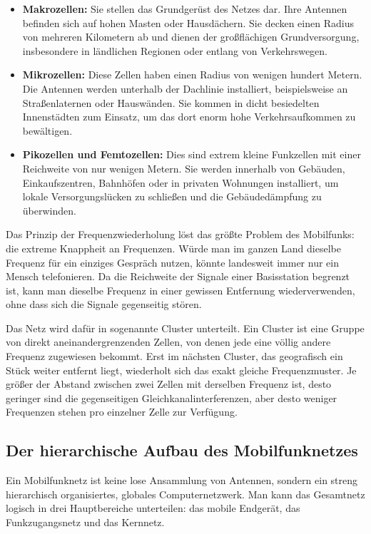 \documentclass[11pt,a4paper]{article}
\begin{document}
\begin{itemize}
    \item \textbf{Makrozellen:} Sie stellen das Grundgerüst des Netzes dar. Ihre Antennen befinden sich auf hohen Masten oder Hausdächern. Sie decken einen Radius von mehreren Kilometern ab und dienen der großflächigen Grundversorgung, insbesondere in ländlichen Regionen oder entlang von Verkehrswegen.
    \item \textbf{Mikrozellen:} Diese Zellen haben einen Radius von wenigen hundert Metern. Die Antennen werden unterhalb der Dachlinie installiert, beispielsweise an Straßenlaternen oder Hauswänden. Sie kommen in dicht besiedelten Innenstädten zum Einsatz, um das dort enorm hohe Verkehrsaufkommen zu bewältigen.
    \item \textbf{Pikozellen und Femtozellen:} Dies sind extrem kleine Funkzellen mit einer Reichweite von nur wenigen Metern. Sie werden innerhalb von Gebäuden, Einkaufszentren, Bahnhöfen oder in privaten Wohnungen installiert, um lokale Versorgungslücken zu schließen und die Gebäudedämpfung zu überwinden.
\end{itemize}

Das Prinzip der Frequenzwiederholung löst das größte Problem des Mobilfunks: die extreme Knappheit an Frequenzen. Würde man im ganzen Land dieselbe Frequenz für ein einziges Gespräch nutzen, könnte landesweit immer nur ein Mensch telefonieren. Da die Reichweite der Signale einer Basisstation begrenzt ist, kann man dieselbe Frequenz in einer gewissen Entfernung wiederverwenden, ohne dass sich die Signale gegenseitig stören. 

Das Netz wird dafür in sogenannte Cluster unterteilt. Ein Cluster ist eine Gruppe von direkt aneinandergrenzenden Zellen, von denen jede eine völlig andere Frequenz zugewiesen bekommt. Erst im nächsten Cluster, das geografisch ein Stück weiter entfernt liegt, wiederholt sich das exakt gleiche Frequenzmuster. Je größer der Abstand zwischen zwei Zellen mit derselben Frequenz ist, desto geringer sind die gegenseitigen Gleichkanalinterferenzen, aber desto weniger Frequenzen stehen pro einzelner Zelle zur Verfügung.

\subsection{Der hierarchische Aufbau des Mobilfunknetzes}

Ein Mobilfunknetz ist keine lose Ansammlung von Antennen, sondern ein streng hierarchisch organisiertes, globales Computernetzwerk. Man kann das Gesamtnetz logisch in drei Hauptbereiche unterteilen: das mobile Endgerät, das Funkzugangsnetz und das Kernnetz.
\end{document}
